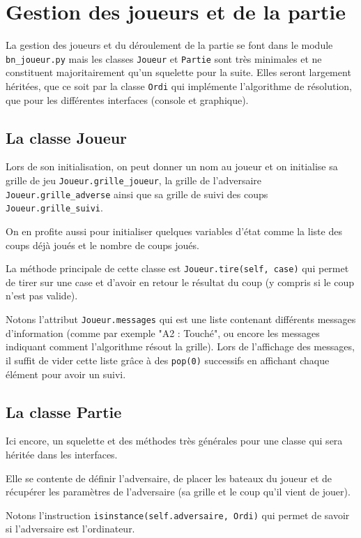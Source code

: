 \chapter{Gestion des joueurs et de la partie}

La gestion des joueurs et du déroulement de la partie se font dans le module \texttt{bn\_joueur.py} mais les classes \texttt{Joueur} et \texttt{Partie} sont très minimales et ne constituent majoritairement qu'un squelette pour la suite. Elles seront largement héritées, que ce soit par la classe \texttt{Ordi} qui implémente l'algorithme de résolution, que pour les différentes interfaces (console et graphique).

\section{La classe Joueur}
Lors de son initialisation, on peut donner un nom au joueur et on initialise sa grille de jeu \texttt{Joueur.grille\_joueur}, la grille de l'adversaire \texttt{Joueur.grille\_adverse} ainsi que sa grille de suivi des coups \texttt{Joueur.grille\_suivi}.

On en profite aussi pour initialiser quelques variables d'état comme la liste des coups déjà joués et le nombre de coups joués.

La méthode principale de cette classe est \texttt{Joueur.tire(self, case)} qui permet de tirer sur une case et d'avoir en retour le résultat du coup (y compris si le coup n'est pas valide).

\medskip

Notons l'attribut \texttt{Joueur.messages} qui est une liste contenant différents messages d'information (comme par exemple "A2 : Touché", ou encore les messages indiquant comment l'algorithme résout la grille). Lors de l'affichage des messages, il suffit de vider cette liste grâce à des \texttt{pop(0)} successifs en affichant chaque élément pour avoir un suivi.

\section{La classe Partie}
Ici encore, un squelette et des méthodes très générales pour une classe qui sera héritée dans les interfaces.

Elle se contente de définir l'adversaire, de placer les bateaux du joueur et de récupérer les paramètres de l'adversaire (sa grille et le coup qu'il vient de jouer).

Notons l'instruction \texttt{isinstance(self.adversaire, Ordi)} qui permet de savoir si l'adversaire est l'ordinateur.

